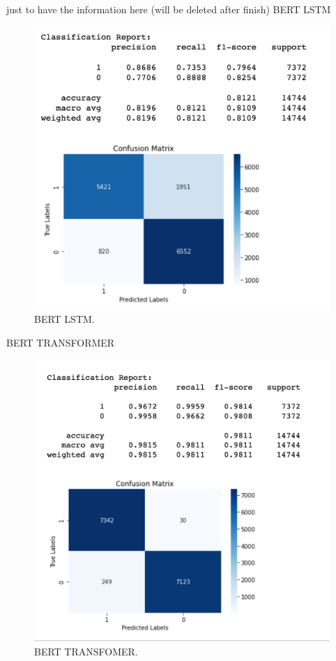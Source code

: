 \documentclass[11pt]{article}
\begin{document}


\newpage
just to have the information here (will be deleted after finish)
BERT LSTM
\begin{figure}[H]
    \centering
       \includegraphics[scale=.6]{figures/BERT LSTM.png}
   \caption{BERT LSTM.}
   \label{fig:1}
\end{figure}


BERT TRANSFORMER
\begin{figure}[H]
    \centering
       \includegraphics[scale=.6]{figures/TRANSFORMER.png}
   \caption{BERT TRANSFOMER.}
   \label{fig:2}
\end{figure}
\end{document}
